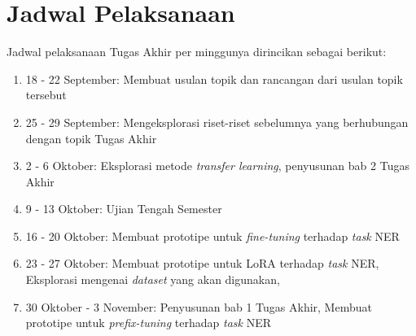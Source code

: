 \section{Jadwal Pelaksanaan}

Jadwal pelaksanaan Tugas Akhir per minggunya dirincikan sebagai berikut:
\begin{enumerate}
    \item 18 - 22 September: Membuat usulan topik dan rancangan dari usulan topik
    tersebut
    \item 25 - 29 September: Mengeksplorasi riset-riset sebelumnya yang
    berhubungan dengan topik Tugas Akhir
    \item 2 - 6 Oktober: Eksplorasi metode \textit{transfer learning}, penyusunan bab 2 Tugas
    Akhir
    \item 9 - 13 Oktober: Ujian Tengah Semester
    \item 16 - 20 Oktober: Membuat prototipe untuk \textit{fine-tuning} terhadap \textit{task} NER
    \item 23 - 27 Oktober: Membuat prototipe untuk LoRA terhadap \textit{task} NER, Eksplorasi mengenai \textit{dataset} yang akan digunakan, 
    \item 30 Oktober - 3 November: Penyusunan bab 1 Tugas Akhir, Membuat prototipe untuk \textit{prefix-tuning} terhadap \textit{task} NER
\end{enumerate}